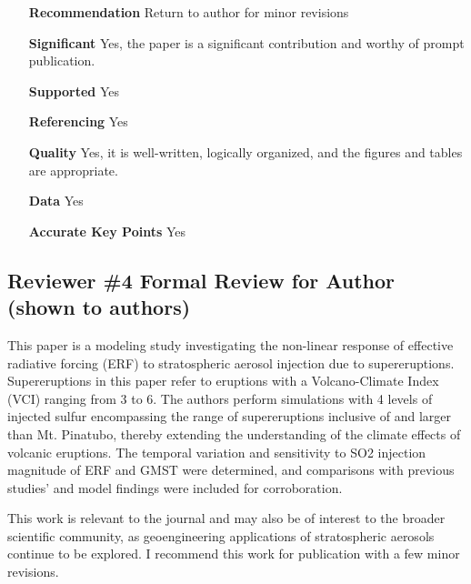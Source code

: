 \documentclass{reviewresponse}
\newenvironment{evaluation}{%
  \begin{tcolorbox}[attach title to upper, title={Evaluations}, after title={.\enskip},
    fonttitle={\bfseries}, coltitle={colorevalfg}, colback={colorevalbg},
    colframe={colorevalframe},]
  }{
  \end{tcolorbox}
}
\begin{document}
  \begin{evaluation}
    \begin{itemize}[leftmargin=4.5cm,noitemsep]
      \item
      [\textbf{Recommendation}] Return to author for minor revisions
      \item
      [\textbf{Significant}] Yes, the paper is a significant contribution and worthy of
      prompt publication.
      \item
      [\textbf{Supported}] Yes
      \item
      [\textbf{Referencing}] Yes
      \item
      [\textbf{Quality}] Yes, it is well-written, logically organized, and the figures
      and tables are appropriate.
      \item
      [\textbf{Data}] Yes
      \item
      [\textbf{Accurate Key Points}] Yes
    \end{itemize}
  \end{evaluation}

  \subsection*{Reviewer \#4 Formal Review for Author (shown to authors)}
  \begin{generalcomment}
    This paper is a modeling study investigating the non-linear response of effective
    radiative forcing (ERF) to stratospheric aerosol injection due to supereruptions.
    Supereruptions in this paper refer to eruptions with a Volcano-Climate Index (VCI)
    ranging from 3 to 6. The authors perform simulations with 4 levels of injected
    sulfur encompassing the range of supereruptions inclusive of and larger than Mt.
    Pinatubo, thereby extending the understanding of the climate effects of volcanic
    eruptions. The temporal variation and sensitivity to SO2 injection magnitude of ERF
    and GMST were determined, and comparisons with previous studies' and model findings
    were included for corroboration.

    This work is relevant to the journal and may also be of interest to the broader
    scientific community, as geoengineering applications of stratospheric aerosols
    continue to be explored. I recommend this work for publication with a few minor
    revisions.
  \end{generalcomment}
\end{document}
